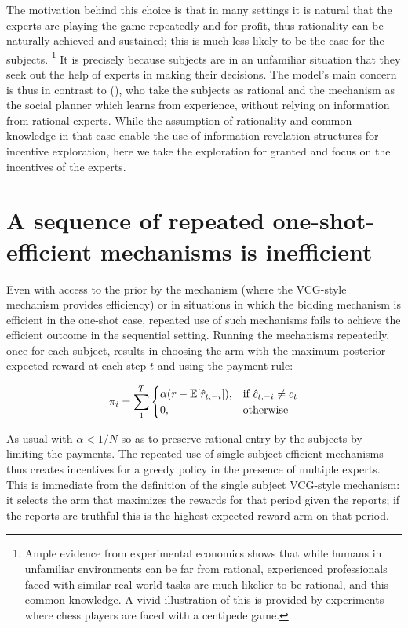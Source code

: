 The motivation behind this choice is that in many settings it is natural that the experts are playing the game repeatedly and for profit, thus rationality can be naturally achieved and sustained; this is much less likely to be the case for the subjects.
\footnote{Ample evidence from experimental economics shows that while humans in unfamiliar environments can be far from rational, experienced professionals faced with similar real world tasks are much likelier to be rational, and this common knowledge. A vivid illustration of this is provided by experiments where chess players are faced with a centipede game.}
It is precisely because subjects are in an unfamiliar situation that they seek out the help of experts in making their decisions.
The model's main concern is thus in contrast to (\cite{kremer2014implementing,mansour2015bayesian}), who take the subjects as rational and the mechanism as the social planner which learns from experience, without relying on information from rational experts.
While the assumption of rationality and common knowledge in that case enable the use of information revelation structures for incentive exploration, here we take the exploration for granted and focus on the incentives of the experts.

\section{A sequence of repeated one-shot-efficient mechanisms is inefficient}

Even with access to the prior by the mechanism (where the VCG-style mechanism provides efficiency) or in situations in which the bidding mechanism is efficient in the one-shot case, repeated use of such mechanisms fails to achieve the efficient outcome in the sequential setting.
Running the mechanisms repeatedly, once for each subject, results in choosing the arm with the maximum posterior expected reward at each step $t$ and using the payment rule:

\[
    \pi_i = \sum_1^T 
\begin{cases}
    \alpha (r - \expec[\hat{r}_{t,-i}]) ,& \text{if } \hat{c}_{t,-i} \neq c_t\\
    0,              & \text{otherwise}
\end{cases}
\]

As usual with $\alpha < 1/N$ so as to preserve rational entry by the subjects by limiting the payments.
The repeated use of single-subject-efficient mechanisms thus creates incentives for a greedy policy in the presence of multiple experts.
This is immediate from the definition of the single subject VCG-style mechanism: it selects the arm that maximizes the rewards for that period given the reports; if the reports are truthful this is the highest expected reward arm on that period.


